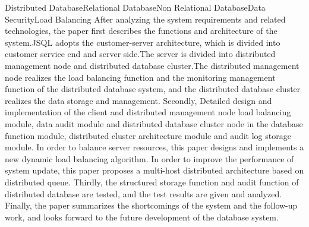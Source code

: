 \begin{Eabstract}{Distributed Database}{Relational Database}{Non Relational Database}{Data Security}{Load Balancing}
After analyzing the system requirements and related technologies, the paper first describes the functions and architecture of the system.JSQL adopts the customer-server architecture, which is divided into customer service end and server side.The server is divided into distributed management node and distributed database cluster.The distributed management node realizes the load balancing function and the monitoring management function of the distributed database system, and the distributed database cluster realizes the data storage and management. Secondly, Detailed design and implementation of the client and distributed management node load balancing module, data audit module and distributed database cluster node in the database function module, distributed cluster architecture module and audit log storage module. In order to balance server resources, this paper designs and implements a new dynamic load balancing algorithm. In order to improve the performance of system update, this paper proposes a multi-host distributed architecture based on distributed queue. Thirdly, the structured storage function and audit function of distributed database are tested, and the test results are given and analyzed. Finally, the paper summarizes the shortcomings of the system and the follow-up work, and looks forward to the future development of the database system.
\end{Eabstract}
